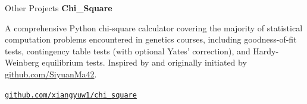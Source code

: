 \begin{rubric}{Other Projects}
\entry*[]
\textbf{Chi\_Square}\par
A comprehensive Python chi-square calculator covering the majority of statistical computation problems encountered in genetics courses, including goodness-of-fit tests, contingency table tests (with optional Yates' correction), and Hardy-Weinberg equilibrium tests. Inspired by and originally initiated by \href{https://github.com/SiyuanMa42/}{github.com/SiyuanMa42}.\par
\href{https://github.com/xiangyuw1/chi_square}{\texttt{github.com/xiangyuw1/chi\_square}}\par
\end{rubric}
